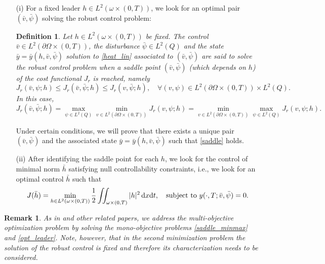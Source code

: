 \documentclass[preprint,10pt]{article}
\newtheorem{definition}[theorem]{Definition}
\newtheorem{remark}[theorem]{Remark}
\numberwithin{equation}{section}
\numberwithin{theorem}{section}
\def\dx{\,\textnormal{d}x}
\def\dt{\textnormal{d}t}
\def\dx{\,\textnormal{d}x}
\def\dt{\textnormal{d}t}
\begin{document}
{\begin{enumerate}
\item[(i)] For a fixed leader $h\in L^2(\omega\times(0,T))$, we look for an optimal pair $(\bar v,\bar \psi)$ solving the robust control problem:
%
\begin{definition}\label{defi_rob}
Let $h\in L^2(\omega\times(0,T))$ be fixed. The control $\bar v\in L^2(\partial \Omega\times(0,T))$, the disturbance $\bar \psi\in L^2(Q)$ and the state $\bar y=\bar y(h,\bar v,\bar \psi)$ solution to \eqref{heat_lin} associated to $(\bar v,\bar \psi)$ are said to solve the robust control problem when a saddle point $(\bar v,\bar \psi)$ (which depends on $h$) of the cost functional $J_r$ is reached, namely
%
\begin{equation}\label{saddle}
J_r(\bar v,\psi;h)\leq J_r(\bar v,\bar \psi;h)\leq J_r(v,\bar \psi;h), \quad \forall (v,\psi)\in L^2(\partial \Omega\times(0,T))\times L^2(Q).
\end{equation}
%
In this case,
%
\begin{equation}\label{saddle_minmax}
J_r(\bar v,\bar \psi;h)=\max_{\psi\in L^2(Q)}\min_{v\in L^2(\partial\Omega\times(0,T))}J_r(v,\psi;h)=\min_{v\in L^2(\partial\Omega\times(0,T))}\max_{\psi\in L^2(Q)}J_r(v,\psi;h).
\end{equation}
%
\end{definition} 
%
Under certain conditions, we will prove that there exists a unique pair $(\bar v,\bar \psi)$ and the associated state $\bar y=\bar y(h,\bar v,\bar\psi)$ such that \eqref{saddle} holds.
%
\item[(ii)] After identifying the saddle point for each $h$, we look for the control of minimal norm $\bar h$ satisfying null controllability constraints, i.e., we look for an optimal control $\bar h$  such that
%
\begin{equation}\label{opt_leader}
J(\bar h)=\min_{h\in L^2(\omega\times(0,T))}\frac{1}{2}\iint_{\omega\times(0,T)}|h|^2\dx\dt, \quad \text{subject to } y(\cdot,T;\bar v,\bar \psi)=0.
\end{equation}
\end{enumerate}

\begin{remark}
As in \cite{LionsSta} and other related papers, we address the multi-objective optimization problem by solving the mono-objective problems \eqref{saddle_minmax} and \eqref{opt_leader}. Note, however, that in the second minimization problem the solution of the robust control is fixed and therefore its characterization needs to be considered.
\end{remark}

}
\end{document}
